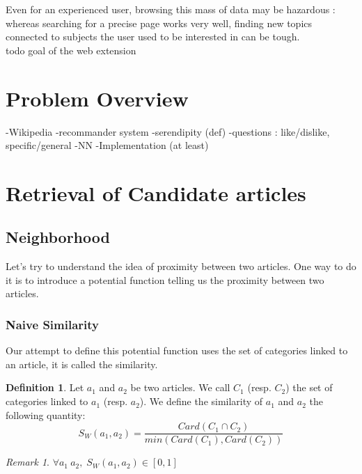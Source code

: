 \documentclass[11pt]{article}
\theoremstyle{plain}
\theoremstyle{definition}
\newtheorem{defn}{Definition}[section]
\theoremstyle{remark}
\newtheorem*{rem}{Remark}
\begin{document}
Even for an experienced user, browsing this mass of data may be hazardous : whereas searching for a precise page works very well, finding new topics connected to subjects the user used to be interested in can be tough. \\

todo goal of the web extension

\section{Problem Overview}
-Wikipedia
-recommander system
-serendipity (def)
-questions : like/dislike, specific/general
-NN
-Implementation
(at least)



\section{Retrieval of Candidate articles}

\subsection{Neighborhood}

Let's try to understand the idea of proximity between two articles. One way to do it is to introduce a potential function telling us the proximity between two articles.

\subsubsection{Naive Similarity}

Our attempt to define this potential function uses the set of categories linked to an article, it is called the similarity.





\vspace*{5mm}
\begin{defn}
  Let $a_1$ and $a_2$ be two articles. We call $C_1$ (resp. $C_2$) the set of categories linked to $a_1$ (resp. $a_2$).
  We define the similarity of $a_1$ and $a_2$ the following quantity:\\
  \begin{equation*}
    S_W(a_1,a_2) = \frac{Card(C_1 \cap C_2)}{min(Card(C_1),Card(C_2))}
  \end{equation*}
\end{defn}

\begin{rem}
  $\forall a_1\: a_2,\; S_W(a_1,a_2) \in [0,1]$
\end{rem}
\end{document}
